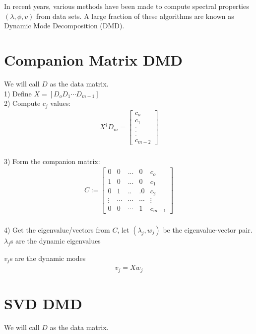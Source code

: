 \documentclass{article}
\begin{document}
In recent years, various methods have been made to compute spectral properties $(\lambda,\phi,v)$ from data sets. A large fraction of these algorithms are known as Dynamic Mode Decomposition (DMD).

\section{Companion Matrix DMD}
We will call $D$ as the data matrix.\\

1) Define $X=[D_o D_1 \cdots D_{m-1}]$\\

2) Compute $c_j$ values:\\
\begin{align*}
X^\dagger D_m = \begin{bmatrix}
c_o \\
c_1 \\
.\\
.\\
.\\
c_{m-2}
\end{bmatrix}
\end{align*}\\

3) Form the companion matrix:
\begin{align*}
C:= \begin{bmatrix}
0 & 0 &...& 0 &c_o \\
1 &0& ...&  0& c_1 \\
0 &1& ..&. 0& c_2 \\
\vdots& \cdots& \cdots& \cdots & \vdots \\
0 &0& \cdots& 1& c_{m-1}
\end{bmatrix}
\end{align*}\\

4) Get the eigenvalue/vectors from $C$, let $(\lambda_j,w_j)$ be the eigenvalue-vector pair.\\

$\lambda_j$s are the dynamic eigenvalues\

$v_j$s are the dynamic modes\\
\begin{align*}
v_j=Xw_j
\end{align*}

\section{SVD DMD}
We will call $D$ as the data matrix.\\
\end{document}
